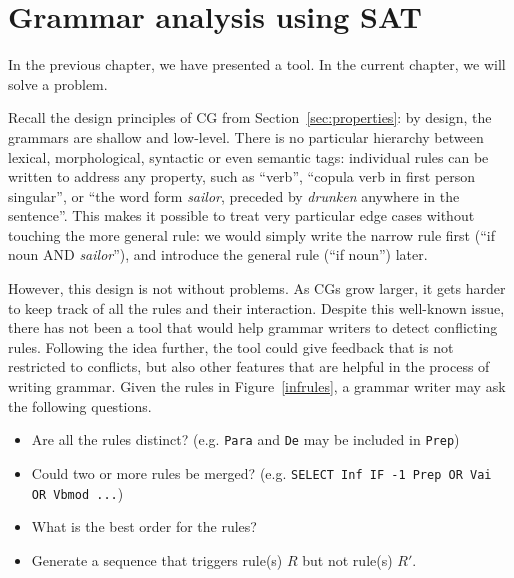 \chapter{Grammar analysis using SAT}
\label{chapterCGana}


In the previous chapter, we have presented a tool.
In the current chapter, we will solve a problem.




Recall the design principles of CG from Section~\ref{sec:properties}: 
by design, the grammars are shallow and low-level.
There is no particular hierarchy between lexical, morphological,
syntactic or even semantic tags: individual rules can be written to address any
property, such as ``verb'', ``copula verb in first person singular'',
or ``the word form \emph{sailor}, preceded by \emph{drunken} anywhere in the
sentence''. This makes it possible to treat very particular edge
cases without touching the more general rule: we would simply write
the narrow rule first (``if noun AND \emph{sailor}''), and introduce
the general rule (``if noun'') later.


However, this design is not without problems. As CGs grow larger, it
gets harder to keep track of all the rules and their interaction.
Despite this well-known issue, there has not been a tool that would help 
grammar writers to detect conflicting rules.
Following the idea further, the tool could give feedback that is not 
restricted to conflicts, but also other features that are helpful 
in the process of writing grammar.
Given the rules in Figure~\ref{infrules}, a grammar writer may 
ask the following questions.



\begin{itemize}
\item Are all the rules distinct? (e.g. \texttt{Para} and \texttt{De} may be included in \texttt{Prep})
\item Could two or more rules be merged? (e.g. \texttt{SELECT Inf IF -1 Prep OR Vai OR Vbmod ...})
\item What is the best order for the rules?
\item Generate a sequence that triggers rule(s) $R$ but not rule(s) $R'$. 
\end{itemize}



